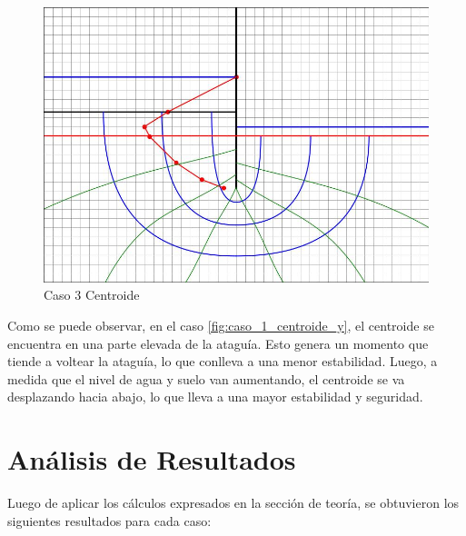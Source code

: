 \begin{figure}[H]
\begin{minipage}{0.32\textwidth}
        \includegraphics[width=\textwidth]{GRAFICOS/caso_3_centroide_y.jpg}
        \caption{Caso 3 Centroide}
        \label{fig:caso_3_centroide_y}
    \end{minipage}
\end{figure}

Como se puede observar, en el caso \ref{fig:caso_1_centroide_y}, el centroide se encuentra en una parte elevada de la ataguía. Esto genera un momento que tiende a voltear la ataguía, lo que conlleva a una menor estabilidad. Luego, a medida que el nivel de agua y suelo van aumentando, el centroide se va desplazando hacia abajo, lo que lleva a una mayor estabilidad y seguridad. 

\section{Análisis de Resultados}

Luego de aplicar los cálculos expresados en la sección de teoría, se obtuvieron los siguientes resultados para cada caso:

